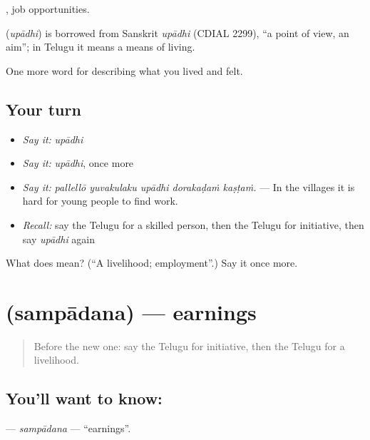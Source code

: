  , job opportunities.

\begin{cousinweb}
\textbf{} (\emph{upādhi}) is borrowed from Sanskrit \emph{upādhi} (CDIAL 2299), \textquotedblleft{}a point of view, an aim\textquotedblright{}; in Telugu it means a means of living.
\end{cousinweb}

\begin{grammarlens}[title={What you've built}]
One more word for describing what you lived and felt.
\end{grammarlens}

\subsection*{Your turn}
\begin{itemize}
\raggedright
  \item \emph{Say it:} \emph{upādhi}
  \item \emph{Say it:} \emph{upādhi}, once more
  \item \emph{Say it:} \emph{pallellō yuvakulaku upādhi dorakaḍaṁ kaṣṭaṁ.} — In the villages it is hard for young people to find work.
  \item \emph{Recall:} say the Telugu for a skilled person, then the Telugu for initiative, then say \emph{upādhi} again
\end{itemize}

\begin{tcolorbox}[breakable,colback=teal!4,colframe=teal!35!black,title={Before you move on}]
What does  mean? (\textquotedblleft{}A livelihood; employment\textquotedblright{}.) Say it once more.
\end{tcolorbox}
\section[\texorpdfstring{\te{సంపాదన} (sampādana)}{సంపాదన (sampādana)}]{ (sampādana) — earnings}

\label{lesson:TE-C525-sampadana}



\begin{quote}
Before the new one: say the Telugu for initiative, then the Telugu for a livelihood.
\end{quote}

\subsection*{You'll want to know: }
\textbf{} — \emph{sampādana} — \textquotedblleft{}earnings\textquotedblright{}.

